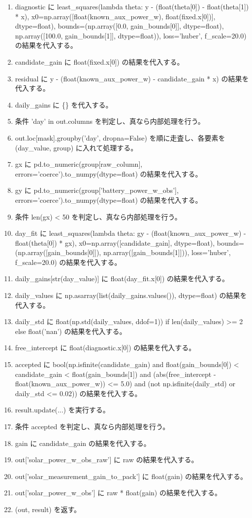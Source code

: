 \documentclass[a4paper,11pt]{article}
\begin{document}
\begin{enumerate}[leftmargin=1.8em]
\item   diagnostic に least\_squares(lambda theta: y - (float(theta[0]) - float(theta[1]) * x), x0=np.array([float(known\_aux\_power\_w), float(fixed.x[0])], dtype=float), bounds=(np.array([0.0, gain\_bounds[0]], dtype=float), np.array([100.0, gain\_bounds[1]], dtype=float)), loss='huber', f\_scale=20.0) の結果を代入する。
\item   candidate\_gain に float(fixed.x[0]) の結果を代入する。
\item   residual に y - (float(known\_aux\_power\_w) - candidate\_gain * x) の結果を代入する。
\item   daily\_gains に \{\} を代入する。
\item   条件 'day' in out.columns を判定し、真なら内部処理を行う。
\item     out.loc[mask].groupby('day', dropna=False) を順に走査し、各要素を (day\_value, group) に入れて処理する。
\item       gx に pd.to\_numeric(group[raw\_column], errors='coerce').to\_numpy(dtype=float) の結果を代入する。
\item       gy に pd.to\_numeric(group['battery\_power\_w\_obs'], errors='coerce').to\_numpy(dtype=float) の結果を代入する。
\item       条件 len(gx) < 50 を判定し、真なら内部処理を行う。
\item       day\_fit に least\_squares(lambda theta: gy - (float(known\_aux\_power\_w) - float(theta[0]) * gx), x0=np.array([candidate\_gain], dtype=float), bounds=(np.array([gain\_bounds[0]]), np.array([gain\_bounds[1]])), loss='huber', f\_scale=20.0) の結果を代入する。
\item       daily\_gains[str(day\_value)] に float(day\_fit.x[0]) の結果を代入する。
\item   daily\_values に np.asarray(list(daily\_gains.values()), dtype=float) の結果を代入する。
\item   daily\_std に float(np.std(daily\_values, ddof=1)) if len(daily\_values) >= 2 else float('nan') の結果を代入する。
\item   free\_intercept に float(diagnostic.x[0]) の結果を代入する。
\item   accepted に bool(np.isfinite(candidate\_gain) and float(gain\_bounds[0]) < candidate\_gain < float(gain\_bounds[1]) and (abs(free\_intercept - float(known\_aux\_power\_w)) <= 5.0) and (not np.isfinite(daily\_std) or daily\_std <= 0.02)) の結果を代入する。
\item   result.update(...) を実行する。
\item   条件 accepted を判定し、真なら内部処理を行う。
\item     gain に candidate\_gain の結果を代入する。
\item out['solar\_power\_w\_obs\_raw'] に raw の結果を代入する。
\item out['solar\_measurement\_gain\_to\_pack'] に float(gain) の結果を代入する。
\item out['solar\_power\_w\_obs'] に raw * float(gain) の結果を代入する。
\item (out, result) を返す。
            \end{enumerate}
\end{document}
